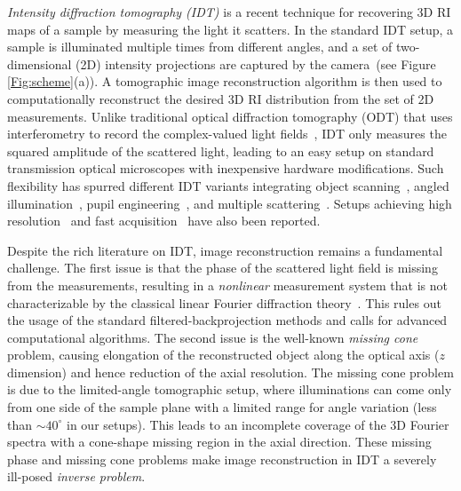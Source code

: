\documentclass[11pt]{article}
\theoremstyle{plain} %
\begin{document}
\emph{Intensity diffraction tomography (IDT)} is a recent technique for recovering 3D RI maps of a sample by measuring the light it scatters. In the standard IDT setup, a sample is illuminated multiple times from different angles, and a set of two-dimensional (2D) intensity projections are captured by the camera~(see Figure \ref{Fig:scheme}(a)). A tomographic image reconstruction algorithm is then used to computationally reconstruct the desired 3D RI distribution from the set of 2D measurements. Unlike traditional optical diffraction tomography (ODT) that uses interferometry to record the complex-valued light fields~\cite{Park.etal2008,Sung.etal2009,Kamilov.etal2015b}, IDT only measures the squared amplitude of the scattered light, leading to an easy setup on standard transmission optical microscopes with inexpensive hardware modifications. Such flexibility has spurred different IDT variants integrating object scanning~\cite{Gbur.etal02, Jenkins.etal2015}, angled illumination~\cite{Tian.Waller2015, Chen.etal2016, Ling.etal18, LiJ.etal2018}, pupil engineering~\cite{Wang.etal2011, Nguyen.etal2017}, and multiple scattering~\cite{Chowdhury.etal2019, Chen.etal2020}. Setups achieving high resolution~\cite{Chowdhury.etal2019} and fast acquisition~\cite{LiJ.etal2019} have also been reported.

Despite the rich literature on IDT, image reconstruction remains a fundamental challenge. The first issue is that the phase of the scattered light field is missing from the measurements, resulting in a \emph{nonlinear} measurement system that is not characterizable by the classical linear Fourier diffraction theory~\cite{Kak.Slaney1988}.
This rules out the usage of the standard filtered-backprojection methods and calls for advanced computational algorithms. The second issue is the well-known \emph{missing cone} problem, causing elongation of the reconstructed  object along the optical axis ($z$ dimension) and hence reduction of the axial resolution.
The missing cone problem is due to the limited-angle tomographic setup, where illuminations can come only from one side of the sample plane with a limited range for angle variation (less than  $\sim40^\circ$ in our setups). This leads to an incomplete coverage of the 3D Fourier spectra with a cone-shape missing region in the axial direction.
These missing phase and missing cone problems make image reconstruction in IDT a severely ill-posed \emph{inverse problem}. 
\end{document}
